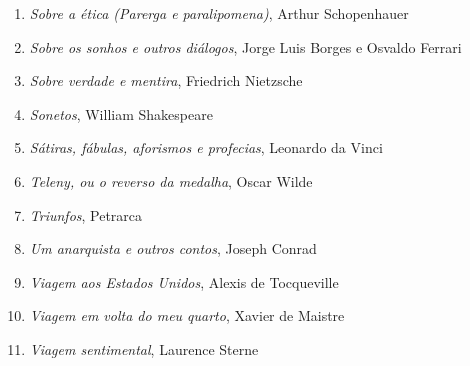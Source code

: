 \begin{enumerate}
\item \textit{Sobre a ética (Parerga e paralipomena)}, Arthur Schopenhauer 
\item \textit{Sobre os sonhos e outros diálogos}, Jorge Luis Borges e Osvaldo Ferrari
\item \textit{Sobre verdade e mentira}, Friedrich Nietzsche
\item \textit{Sonetos}, William Shakespeare
\item \textit{Sátiras, fábulas, aforismos e profecias}, Leonardo da Vinci
\item \textit{Teleny, ou o reverso da medalha}, Oscar Wilde
\item \textit{Triunfos}, Petrarca
\item \textit{Um anarquista e outros contos}, Joseph Conrad
\item \textit{Viagem aos Estados Unidos}, Alexis de Tocqueville
\item \textit{Viagem em volta do meu quarto}, Xavier de Maistre 
\item \textit{Viagem sentimental}, Laurence Sterne
\end{enumerate}






